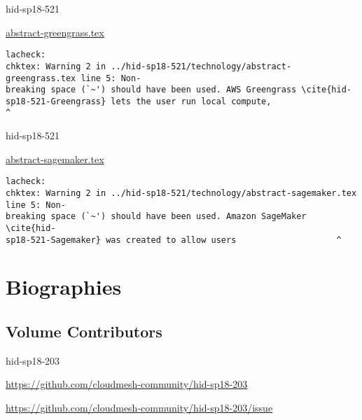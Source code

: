 \begin{IU}

hid-sp18-521

\href{https://github.com/cloudmesh-community/hid-sp18-521/blob/master//technology/abstract-greengrass.tex}{abstract-greengrass.tex}

\begin{tiny}
\begin{verbatim}
lacheck: 
chktex: Warning 2 in ../hid-sp18-521/technology/abstract-greengrass.tex line 5: Non-
breaking space (`~') should have been used. AWS Greengrass \cite{hid-
sp18-521-Greengrass} lets the user run local compute,                  ^
\end{verbatim}
\end{tiny}
\end{IU}



\begin{IU}

hid-sp18-521

\href{https://github.com/cloudmesh-community/hid-sp18-521/blob/master//technology/abstract-sagemaker.tex}{abstract-sagemaker.tex}

\begin{tiny}
\begin{verbatim}
lacheck: 
chktex: Warning 2 in ../hid-sp18-521/technology/abstract-sagemaker.tex line 5: Non-
breaking space (`~') should have been used. Amazon SageMaker \cite{hid-
sp18-521-Sagemaker} was created to allow users                    ^
\end{verbatim}
\end{tiny}
\end{IU}

\part{Biographies}
\chapter{Volume Contributors}


\begin{IU}

hid-sp18-203

\url{https://github.com/cloudmesh-community/hid-sp18-203}

\url{https://github.com/cloudmesh-community/hid-sp18-203/issue}

\end{IU}


